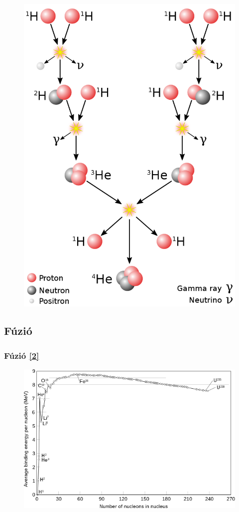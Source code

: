 \documentclass{beamer}
\begin{document}
\begin{frame}
\begin{figure}
        \includegraphics[scale=0.13]{800px-Fusion_in_the_Sun.svg.png}
    \end{figure} 
\end{frame}


\subsection{Fúzió}
\begin{frame}
    \frametitle{Fúzió \hyperlink{2}{\small[2]}}
    \begin{figure}
        \includegraphics[scale=0.5]{Binding_energy_curve_-_common_isotopes.svg.png}
    \end{figure} 
\end{frame}
\end{document}

